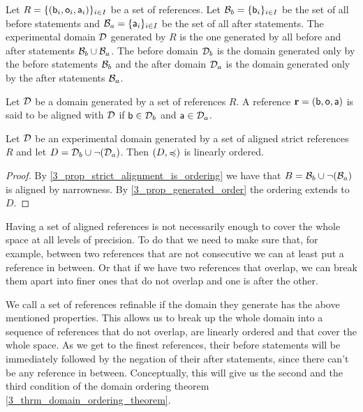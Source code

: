 \documentclass[11pt,letterpaper,fleqn]{memoir} %
\begin{document}
\begin{mathSection}

\begin{defn}
	Let $R = \{( \stmt[b]_i, \stmt[o]_i, \stmt[a]_i )\}_{i \in I}$ be a set of references. Let $\basis_b = \{\stmt[b]_i\}_{i \in I}$ be the set of all before statements and $\basis_a = \{\stmt[a]_i\}_{i \in I}$ be the set of all after statements. The experimental domain $\edomain$ generated by $R$ is the one generated by all before and after statements $\basis_b \cup \basis_a$. The before domain $\edomain_b$ is the domain generated only by the before statements $\basis_b$ and the after domain $\edomain_a$ is the domain generated only by the after statements $\basis_a$.
\end{defn}

\begin{defn}
	Let $\edomain$ be a domain generated by a set of references $R$. A reference $\refStmt = ( \stmt[b], \stmt[o], \stmt[a] )$ is said to be aligned with $\edomain$ if $\stmt[b] \in \edomain_b$ and $\stmt[a] \in \edomain_a$.
\end{defn}

\begin{prop}\label{3_prop_basis_generate_ordering}
	Let $\edomain$ be an experimental domain generated by a set of aligned strict references $R$ and let $D=\edomain_b \cup \NOT (\edomain_a)$. Then $(D, \narrower)$ is linearly ordered.
\end{prop}
\begin{proof}
	By \ref{3_prop_strict_alignment_is_ordering} we have that $B = \basis_b \cup \NOT(\basis_a)$ is aligned by narrowness. By \ref{3_prop_generated_order} the ordering extends to $D$.
\end{proof}

\end{mathSection}

Having a set of aligned references is not necessarily enough to cover the whole space at all levels of precision. To do that we need to make sure that, for example, between two references that are not consecutive we can at least put a reference in between. Or that if we have two references that overlap, we can break them apart into finer ones that do not overlap and one is after the other.

We call a set of references refinable if the domain they generate has the above mentioned properties. This allows us to break up the whole domain into a sequence of references that do not overlap, are linearly ordered and that cover the whole space. As we get to the finest references, their before statements will be immediately followed by the negation of their after statements, since there can't be any reference in between. Conceptually, this will give us the second and the third condition of the domain ordering theorem \ref{3_thrm_domain_ordering_theorem}.
\end{document}

